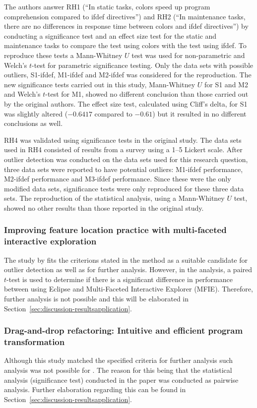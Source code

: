 The authors answer RH1 (``In static tasks, colors speed up program comprehension compared to ifdef directives'') and RH2 (``In maintenance tasks, there are no differences in response time between colors and ifdef directives'') by conducting a significance test and an effect size test for the static and maintenance tasks to compare the test using colors with the test using ifdef. To reproduce these tests a Mann-Whitney $U$ test was used for non-parametric and Welch's $t$-test for parametric significance testing. Only the data sets with possible outliers, S1-ifdef, M1-ifdef and M2-ifdef was considered for the reproduction. The new significance tests carried out in this study, Mann-Whitney $U$ for S1 and M2 and Welch's $t$-test for M1, showed no different conclusion than those carried out by the original authors. The effect size test, calculated using Cliff's delta, for S1 was slightly altered ($-0.6417$ compared to $-0.61$) but it resulted in no different conclusions as well.




RH4 was validated using significance tests in the original study. The data sets used in RH4 consisted of results from a survey using a 1--5 Lickert scale. After outlier detection was conducted on the data sets used for this research question, three data sets were reported to have potential outliers: M1-ifdef performance, M2-ifdef performance and M3-ifdef performance. Since these were the only modified data sets, significance tests were only reproduced for these three data sets. The reproduction of the statistical analysis, using a Mann-Whitney $U$ test, showed no other results than those reported in the original study.


\subsubsection{Improving feature location practice with multi-faceted interactive exploration}
The study by \citet{wang2013improving} fits the criterions stated in the method as a suitable candidate for outlier detection as well as for further analysis. However, in the analysis, a paired $t$-test is used to determine if there is a significant difference in performance between using Eclipse and Multi-Faceted Interactive Explorer (MFIE). Therefore, further analysis is not possible and this will be elaborated in Section~\ref{sec:discussion-resultsapplication}.




\subsubsection{Drag-and-drop refactoring: Intuitive and efficient program transformation}
Although this study matched the specified criteria for further analysis such analysis was not possible for \citep{lee2013drag}. The reason for this being that the statistical analysis (significance test) conducted in the paper was conducted as pairwise analysis. Further elaboration regarding this can be found in Section~\ref{sec:discussion-resultsapplication}.




